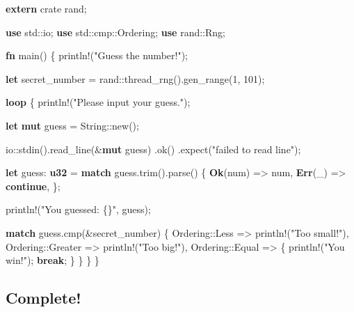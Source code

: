 \documentclass[a4paper,]{book}
\newenvironment{Shaded}{\begin{snugshade}}{\end{snugshade}}
\newcommand{\KeywordTok}[1]{\textcolor[rgb]{0.13,0.29,0.53}{\textbf{{#1}}}}
\newcommand{\DecValTok}[1]{\textcolor[rgb]{0.00,0.00,0.81}{{#1}}}
\newcommand{\StringTok}[1]{\textcolor[rgb]{0.31,0.60,0.02}{{#1}}}
\newcommand{\OtherTok}[1]{\textcolor[rgb]{0.56,0.35,0.01}{{#1}}}
\newcommand{\NormalTok}[1]{{#1}}
\begin{document}
\begin{Shaded}
\begin{Highlighting}[]
\KeywordTok{extern} \NormalTok{crate rand;}

\KeywordTok{use} \NormalTok{std::io;}
\KeywordTok{use} \NormalTok{std::cmp::Ordering;}
\KeywordTok{use} \NormalTok{rand::Rng;}

\KeywordTok{fn} \NormalTok{main() \{}
    \OtherTok{println!}\NormalTok{(}\StringTok{"Guess the number!"}\NormalTok{);}

    \KeywordTok{let} \NormalTok{secret_number = rand::thread_rng().gen_range(}\DecValTok{1}\NormalTok{, }\DecValTok{101}\NormalTok{);}

    \KeywordTok{loop} \NormalTok{\{}
        \OtherTok{println!}\NormalTok{(}\StringTok{"Please input your guess."}\NormalTok{);}

        \KeywordTok{let} \KeywordTok{mut} \NormalTok{guess = String::new();}

        \NormalTok{io::stdin().read_line(&}\KeywordTok{mut} \NormalTok{guess)}
            \NormalTok{.ok()}
            \NormalTok{.expect(}\StringTok{"failed to read line"}\NormalTok{);}

        \KeywordTok{let} \NormalTok{guess: }\KeywordTok{u32} \NormalTok{= }\KeywordTok{match} \NormalTok{guess.trim().parse() \{}
            \KeywordTok{Ok}\NormalTok{(num) => num,}
            \KeywordTok{Err}\NormalTok{(_) => }\KeywordTok{continue}\NormalTok{,}
        \NormalTok{\};}

        \OtherTok{println!}\NormalTok{(}\StringTok{"You guessed: \{\}"}\NormalTok{, guess);}

        \KeywordTok{match} \NormalTok{guess.cmp(&secret_number) \{}
            \NormalTok{Ordering::Less    => }\OtherTok{println!}\NormalTok{(}\StringTok{"Too small!"}\NormalTok{),}
            \NormalTok{Ordering::Greater => }\OtherTok{println!}\NormalTok{(}\StringTok{"Too big!"}\NormalTok{),}
            \NormalTok{Ordering::Equal   => \{}
                \OtherTok{println!}\NormalTok{(}\StringTok{"You win!"}\NormalTok{);}
                \KeywordTok{break}\NormalTok{;}
            \NormalTok{\}}
        \NormalTok{\}}
    \NormalTok{\}}
\NormalTok{\}}
\end{Highlighting}
\end{Shaded}

\subsection{Complete!}\label{complete}
\end{document}
